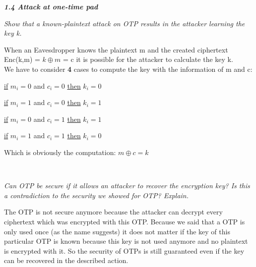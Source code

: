 \documentclass{article}
\begin{document}
	\textbf{\textit{1.4 Attack at one-time pad}} \\
	\begin{compactenum}[a.)]
		\item \textit{Show that a known-plaintext attack on OTP results in the attacker learning the key k.} \\
		\begin{compactenum}[{}]
			\item When an Eavesdropper knows the plaintext m and the created ciphertext Enc(k,m) = $k \oplus m$ = c it is possible for the attacker to calculate the key k. \\
			We have to consider \textbf{4} cases to compute the key with the information of m and c:
			\begin{compactenum}
				\item \underline{if} $m_i=0$ and $c_i=0$ \underline{then} $k_i = 0$
				\item \underline{if} $m_i=1$ and $c_i=0$ \underline{then} $k_i = 1$
				\item \underline{if} $m_i=0$ and $c_i=1$ \underline{then} $k_i = 1$
				\item \underline{if} $m_i=1$ and $c_i=1$ \underline{then} $k_i = 0$
			\end{compactenum}
			Which is obviously the computation: $m \oplus c = k$
		\end{compactenum}
		\hfill \\
		\item \textit{Can OTP be secure if it allows an attacker to recover the encryption key? Is this a contradiction to the security we showed for OTP? Explain.} \\
		\begin{compactenum}[{}]
			\item The OTP is not secure anymore because the attacker can decrypt every ciphertext which was encrypted with this OTP. Because we said that a OTP is only used once (as the name suggests) it does not matter if the key of this particular OTP is known because this key is not used anymore and no plaintext is encrypted with it. So the security of OTPs is still guaranteed even if the key can be recovered in the described action. 
		\end{compactenum}
	\end{compactenum}
	
\end{document}

